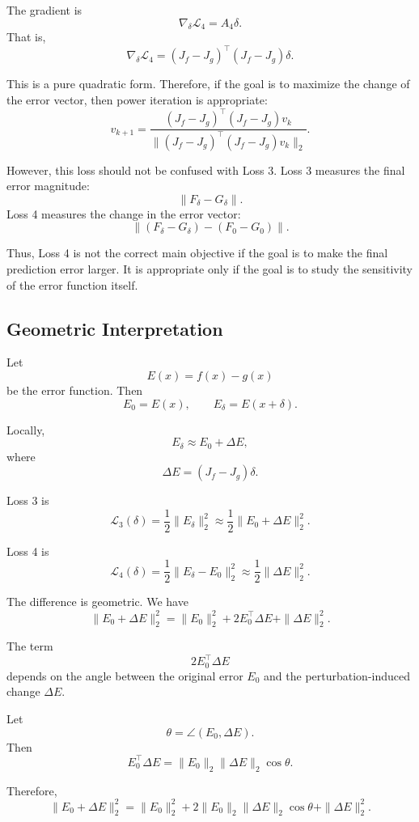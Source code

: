 \documentclass{article}
\begin{document}
The gradient is
\[
    \nabla_\delta \mathcal{L}_4
    =
    A_4\delta.
\]
That is,
\[
    \nabla_\delta \mathcal{L}_4
    =
    (J_f-J_g)^\top(J_f-J_g)\delta.
\]

This is a pure quadratic form. Therefore, if the goal is to maximize the change of the error vector, then power iteration is appropriate:
\[
    v_{k+1}
    =
    \frac{
    (J_f-J_g)^\top(J_f-J_g)v_k
    }
    {
    \|(J_f-J_g)^\top(J_f-J_g)v_k\|_2
    }.
\]

However, this loss should not be confused with Loss 3. Loss 3 measures the final error magnitude:
\[
    \|F_\delta-G_\delta\|.
\]
Loss 4 measures the change in the error vector:
\[
    \|(F_\delta-G_\delta)-(F_0-G_0)\|.
\]

Thus, Loss 4 is not the correct main objective if the goal is to make the final prediction error larger. It is appropriate only if the goal is to study the sensitivity of the error function itself.

\subsection{Geometric Interpretation}

Let
\[
    E(x)=f(x)-g(x)
\]
be the error function. Then
\[
    E_0=E(x),
    \qquad
    E_\delta=E(x+\delta).
\]

Locally,
\[
    E_\delta
    \approx
    E_0+\Delta E,
\]
where
\[
    \Delta E
    =
    (J_f-J_g)\delta.
\]

Loss 3 is
\[
    \mathcal{L}_3(\delta)
    =
    \frac{1}{2}\|E_\delta\|_2^2
    \approx
    \frac{1}{2}\|E_0+\Delta E\|_2^2.
\]

Loss 4 is
\[
    \mathcal{L}_4(\delta)
    =
    \frac{1}{2}\|E_\delta-E_0\|_2^2
    \approx
    \frac{1}{2}\|\Delta E\|_2^2.
\]

The difference is geometric. We have
\[
    \|E_0+\Delta E\|_2^2
    =
    \|E_0\|_2^2
    +
    2E_0^\top \Delta E
    +
    \|\Delta E\|_2^2.
\]

The term
\[
    2E_0^\top \Delta E
\]
depends on the angle between the original error \(E_0\) and the perturbation-induced change \(\Delta E\).

Let
\[
    \theta = \angle(E_0,\Delta E).
\]
Then
\[
    E_0^\top \Delta E
    =
    \|E_0\|_2\|\Delta E\|_2\cos\theta.
\]

Therefore,
\[
    \|E_0+\Delta E\|_2^2
    =
    \|E_0\|_2^2
    +
    2\|E_0\|_2\|\Delta E\|_2\cos\theta
    +
    \|\Delta E\|_2^2.
\]
\end{document}

